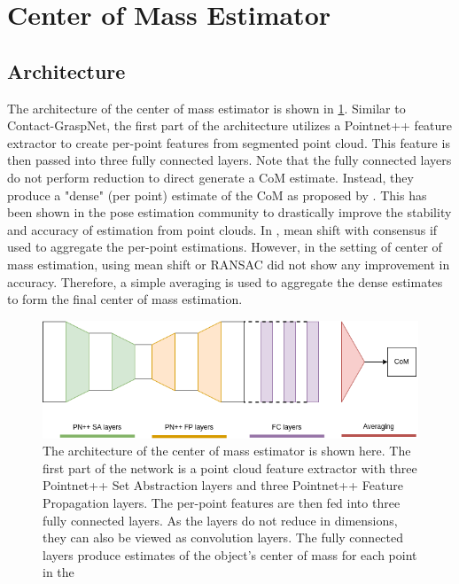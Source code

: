 \documentclass[12pt]{ucsddissertation}
\begin{document}
\section{Center of Mass Estimator}
\subsection{Architecture}
The architecture of the center of mass estimator is shown in \ref{fig:architecture}. Similar to Contact-GraspNet, the first part of the architecture utilizes a Pointnet++ feature extractor to create per-point features from segmented point cloud. This feature is then passed into three fully connected layers. Note that the fully connected layers do not perform reduction to direct generate a CoM estimate. Instead, they produce a "dense" (per point) estimate of the CoM as proposed by \cite{wan2017dense}. This has been shown in the pose estimation community to drastically improve the stability and accuracy of estimation from point clouds. In \cite{wan2017dense}, mean shift with consensus if used to aggregate the per-point estimations. However, in the setting of center of mass estimation, using mean shift or RANSAC did not show any improvement in accuracy. Therefore, a simple averaging is used to aggregate the dense estimates to form the final center of mass estimation.

\begin{figure}
	\centering
	\includegraphics[width=\linewidth]{figures/Architecture.png}
	\caption[Architecture of the center of mass estimator]{The architecture of the center of mass estimator is shown here. The first part of the network is a point cloud feature extractor with three Pointnet++ Set Abstraction layers and three Pointnet++ Feature Propagation layers. The per-point features are then fed into three fully connected layers. As the layers do not reduce in dimensions, they can also be viewed as convolution layers. The fully connected layers produce estimates of the object's center of mass for each point in the}
	\label{fig:architecture}
\end{figure}
\end{document}
